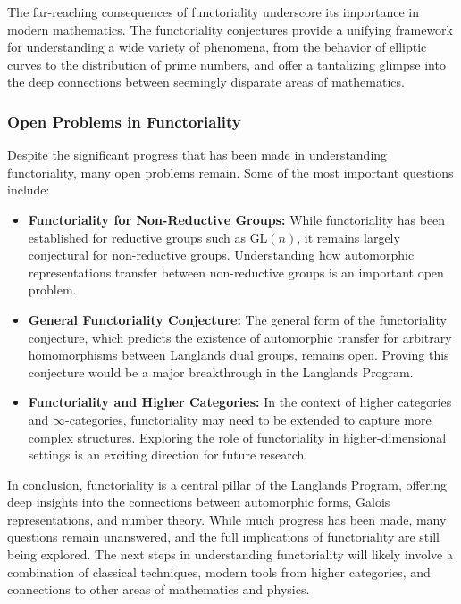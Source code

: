 \documentclass{article}
\theoremstyle{remark}
\begin{document}
The far-reaching consequences of functoriality underscore its importance in modern mathematics. The functoriality conjectures provide a unifying framework for understanding a wide variety of phenomena, from the behavior of elliptic curves to the distribution of prime numbers, and offer a tantalizing glimpse into the deep connections between seemingly disparate areas of mathematics.

\subsubsection{Open Problems in Functoriality}

Despite the significant progress that has been made in understanding functoriality, many open problems remain. Some of the most important questions include:

\begin{itemize}
    \item \textbf{Functoriality for Non-Reductive Groups:} While functoriality has been established for reductive groups such as $\text{GL}(n)$, it remains largely conjectural for non-reductive groups. Understanding how automorphic representations transfer between non-reductive groups is an important open problem.

    \item \textbf{General Functoriality Conjecture:} The general form of the functoriality conjecture, which predicts the existence of automorphic transfer for arbitrary homomorphisms between Langlands dual groups, remains open. Proving this conjecture would be a major breakthrough in the Langlands Program.

    \item \textbf{Functoriality and Higher Categories:} In the context of higher categories and $\infty$-categories, functoriality may need to be extended to capture more complex structures. Exploring the role of functoriality in higher-dimensional settings is an exciting direction for future research.
\end{itemize}

In conclusion, functoriality is a central pillar of the Langlands Program, offering deep insights into the connections between automorphic forms, Galois representations, and number theory. While much progress has been made, many questions remain unanswered, and the full implications of functoriality are still being explored. The next steps in understanding functoriality will likely involve a combination of classical techniques, modern tools from higher categories, and connections to other areas of mathematics and physics.
\end{document}
